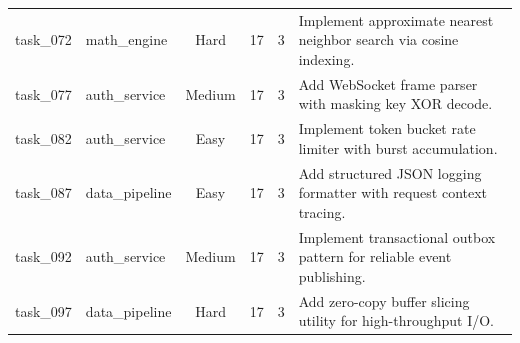 \begin{table}[t]
\begin{tabular}{llcccl}
task\_072 & math\_engine & Hard & 17 & 3 & Implement approximate nearest neighbor search via cosine indexing. \\
task\_077 & auth\_service & Medium & 17 & 3 & Add WebSocket frame parser with masking key XOR decode. \\
task\_082 & auth\_service & Easy & 17 & 3 & Implement token bucket rate limiter with burst accumulation. \\
task\_087 & data\_pipeline & Easy & 17 & 3 & Add structured JSON logging formatter with request context tracing. \\
task\_092 & auth\_service & Medium & 17 & 3 & Implement transactional outbox pattern for reliable event publishing. \\
task\_097 & data\_pipeline & Hard & 17 & 3 & Add zero-copy buffer slicing utility for high-throughput I/O. \\
\bottomrule
\end{tabular}
\end{table}

